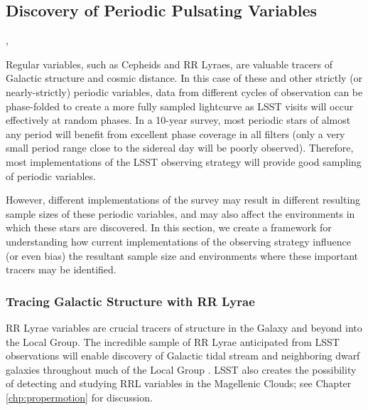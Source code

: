 
%
%
%

\subsection{Discovery of Periodic Pulsating Variables}
\def\secname{periodicvariables}\label{sec:\secname}

,

Regular variables, such as Cepheids and RR Lyraes, are valuable tracers
of Galactic structure and cosmic distance. In this case of these and
other strictly (or nearly-strictly) periodic variables, data from
different cycles of observation can be phase-folded to create a more
fully sampled lightcurve as LSST visits will occur effectively at random
phases. In a 10-year survey, most periodic stars of almost any period
will benefit from excellent phase coverage in all filters (only a very
small period range close to the sidereal day will be poorly observed).
Therefore, most implementations of the LSST observing strategy will
provide good sampling of periodic variables.

However, different implementations of the survey may result in different
resulting sample sizes of these periodic variables, and may also affect
the environments in which these stars are discovered. In this section,
we create a framework for understanding how current implementations of
the observing strategy influence (or even bias) the resultant sample
size and environments where these important tracers may be identified.

\subsubsection{Tracing Galactic Structure with RR Lyrae}

RR Lyrae variables are crucial tracers of structure in the Galaxy and beyond
into the Local Group. The incredible sample of RR Lyrae anticipated from LSST
observations will enable discovery of Galactic tidal stream and neighboring
dwarf galaxies throughout much of the Local Group
\citep{IvezicEtal2008}.  LSST also creates the possibility
of detecting and studying RRL variables in the Magellenic Clouds; see Chapter
\autoref{chp:propermotion} for discussion.

